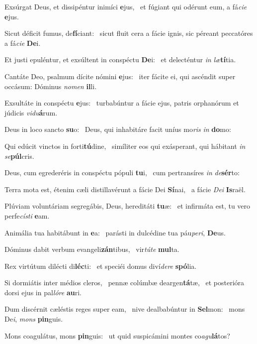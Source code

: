 \item Exsúrgat Deus, et dissipéntur inimíci \textbf{e}jus,~\psstar{} et fúgiant qui odérunt eum, a fá\textit{cie} \textbf{e}jus.
\item Sicut déficit fumus, de\textbf{fí}\-ciant:~\psstar{} sicut fluit cera a fácie ignis, sic péreant peccatóres a fá\textit{cie} \textbf{De}i.
\item Et justi epuléntur, et exsúltent in conspéctu \textbf{De}i:~\psstar{} et delecténtur \textit{in} \textit{læ}\textbf{tí}tia.
\item Cantáte Deo, psalmum dícite nómini \textbf{e}jus:~\psstar{} iter fácite ei, qui ascéndit super occásum: Dóminus \textit{nomen} \textbf{il}li.
\item Exsultáte in conspéctu \textbf{e}jus:~\psstar{} turbabúntur a fácie ejus, patris orphanórum et júdicis \textit{vidu}\textbf{á}rum.
\item Deus in loco sancto \textbf{su}o:~\psstar{} Deus, qui inhabitáre facit uníus mo\textit{ris} \textit{in} \textbf{do}mo:
\item Qui edúcit vinctos in forti\textbf{tú}dine,~\psstar{} simíliter eos qui exásperant, qui hábitant \textit{in} \textit{se}\textbf{púl}cris.
\item Deus, cum egrederéris in conspéctu pópuli \textbf{tu}i,~\psstar{} cum pertransíres \textit{in} \textit{de}\textbf{sér}to:
\item Terra mota est, étenim cæli distillavérunt a fácie Dei \textbf{Sí}nai,~\psstar{} a fácie \textit{Dei} \textbf{Is}raël.
\item Plúviam voluntáriam segregábis, Deus, hereditáti \textbf{tu}æ:~\psstar{} et infirmáta est, tu vero perfe\textit{císti} \textbf{e}am.
\item Animália tua habitábunt in \textbf{e}a:~\psstar{} parásti in dulcédine tua páu\textit{peri}, \textbf{De}us.
\item Dóminus dabit verbum evangeli\textbf{zán}tibus,~\psstar{} vir\textit{túte} \textbf{mul}ta.
\item Rex virtútum dilécti di\textbf{léc}ti:~\psstar{} et speciéi domus diví\textit{dere} \textbf{spó}lia.
\item Si dormiátis inter médios cleros,~\pscross{} pennæ colúmbæ deargen\textbf{tá}tæ,~\psstar{} et posterióra dorsi ejus in pal\textit{lóre} \textbf{au}ri.
\item Dum discérnit cæléstis reges super eam,~\pscross{} nive dealbabúntur in \textbf{Sel}mon:~\psstar{} mons De\textit{i}, \textit{mons} \textbf{pin}guis.
\item Mons coagulátus, mons \textbf{pin}guis:~\psstar{} ut quid suspicámini montes co\textit{agu}\textbf{lá}tos?
